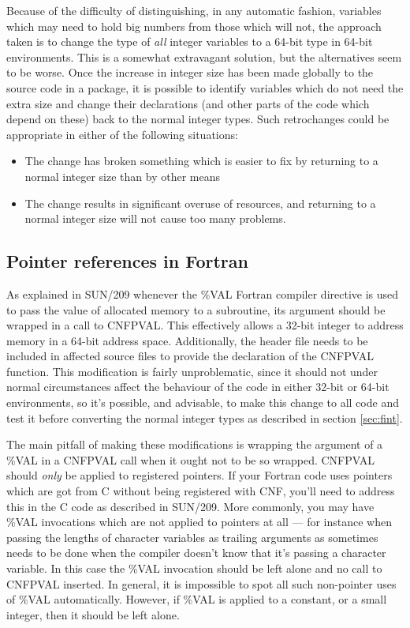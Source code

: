 \documentclass[twoside,11pt]{article}
\newcommand{\xref}[3]{#1}
\renewcommand{\_}{\texttt{\symbol{95}}}
\begin{document}
Because of the difficulty of distinguishing, in any automatic fashion,
variables which may 
need to hold big numbers from those which will not,
the approach taken is to change the type of {\em all\/} 
integer variables to a 64-bit type in 64-bit environments.
This is a somewhat extravagant solution,
but the alternatives seem to be worse.
Once the increase in integer size has been made 
globally to the source code in a package,
it is possible to identify variables which do not need the extra size
and change their declarations (and other parts of the code which depend
on these) back to the normal integer types.
Such retrochanges could be appropriate in either of the following situations:
\begin{itemize}
\item
The change has broken something which is easier to fix by returning to 
a normal integer size than by other means
\item
The change results in significant overuse of resources, 
and returning to a normal
integer size will not cause too many problems.
\end{itemize}


\subsection{Pointer references in Fortran}

As explained in \xref{SUN/209}{sun209}{pointers} 
whenever the \%VAL Fortran compiler directive 
is used to pass the value of allocated
memory to a subroutine, its argument should be wrapped in a call
to \xref{CNF\_PVAL}{sun209}{CNF\_PVAL}.  This effectively allows
a 32-bit integer to address memory in a 64-bit address space.
Additionally, the header file \file{CNF\_PAR} needs to be included
in affected source files to provide the declaration of the CNF\_PVAL 
function.
This modification is fairly unproblematic, 
since it should not under normal
circumstances affect the behaviour of the code in either 32-bit or
64-bit environments, so it's possible, and advisable, to make this
change to all code and test it before converting the normal integer types
as described in section \ref{sec:fint}.  

The main pitfall of making these modifications is
wrapping the argument of a \%VAL in a CNF\_PVAL call when it ought
not to be so wrapped.
CNF\_PVAL should {\em only\/} be applied to registered pointers.
If your Fortran code uses pointers which are got from C without 
being registered with CNF, you'll need to address this in the C code 
as described in \xref{SUN/209}{sun209}{pointers}.
More commonly, you may have \%VAL invocations which are not
applied to pointers at all --- for instance when passing 
the lengths of character variables as trailing arguments 
as sometimes needs to be done when the compiler doesn't know that
it's passing a character variable.  In this case the \%VAL 
invocation should be left alone and no call to CNF\_PVAL inserted.
In general, it is impossible to spot all such non-pointer uses
of \%VAL automatically.  However, if \%VAL is applied to a constant,
or a small integer, then it should be left alone.
\end{document}
